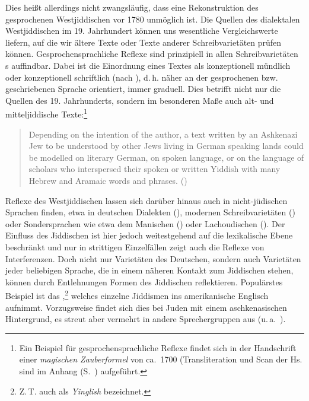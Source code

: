 Dies heißt allerdings nicht zwangsläufig, dass eine Rekonstruktion des gesprochenen Westjiddischen vor 1780 unmöglich ist. Die Quellen des dialektalen Westjiddischen im 19. Jahrhundert können uns wesentliche Vergleichswerte liefern, auf die wir ältere Texte oder Texte anderer Schreibvarietäten prüfen können. Gesprochensprachliche Reflexe sind prinzipiell in allen Schreibvarietäten \citeauthor{Lowenstein1979}s auffindbar. Dabei ist die Einordnung eines Textes als konzeptionell mündlich oder konzeptionell schriftlich (nach \citealt{KochOesterreicher1985}), d.\,h. näher an der gesprochenen bzw. geschriebenen Sprache orientiert, immer graduell. Dies betrifft nicht nur die Quellen des 19. Jahrhunderts, sondern im besonderen Maße auch alt- und mitteljiddische Texte:\footnote{Ein Beispiel für gesprochensprachliche Reflexe findet sich in der Handschrift einer \textit{magischen Zauberformel} von ca.\, 1700 (Transliteration und Scan der Hs. sind im Anhang (S.\, \pageref{part_schirm}) aufgeführt.}

\begin{quote}
Depending on the intention of the author, a text written by an Ashkenazi Jew to be understood by other Jews living in German speaking lands could be modelled on literary German, on spoken language, or on the language of scholars who interspersed their spoken or written Yiddish with many Hebrew and Aramaic words and phrases. (\citealt[117]{Aptroot2010})
\end{quote} 

Reflexe des Westjiddischen lassen sich darüber hinaus auch in nicht-jüdischen Sprachen finden, etwa in deutschen Dialekten (\citealt{Althaus1963,Post1992,Klepsch2004,Stern2000}), modernen Schreibvarietäten (\citealt{Althaus2010}) oder Sondersprachen wie etwa dem Manischen (\citealt{Lerch1976}) oder Lachoudischen (\citealt{Klepsch2004}). Der Einfluss des Jiddischen ist hier jedoch weitestgehend auf die lexikalische Ebene beschränkt und nur in strittigen Einzelfällen zeigt auch die  Reflexe von Interferenzen. Doch nicht nur Varietäten des Deutschen, sondern auch Varietäten jeder beliebigen Sprache, die in einem näheren Kontakt zum Jiddischen stehen, können durch Entlehnungen Formen des Jiddischen reflektieren. Populärstes Beispiel ist das ,\footnote{Z.\,T. auch als \textit{Yinglish} bezeichnet.} welches einzelne Jiddismen ins amerikanische Englisch aufnimmt. Vorzugsweise findet sich dies bei Juden mit einem aschkenasischen Hintergrund, es streut aber vermehrt in andere Sprechergruppen aus (u.\,a.\, \citealt{Benor2000,Benor2009,Gold1985,Fishman1985}).  

